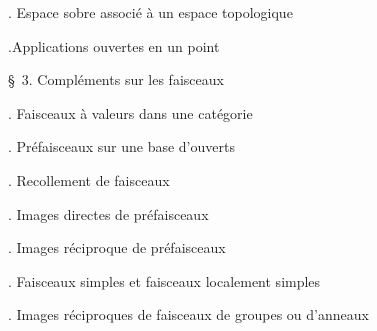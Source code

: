 \noindent{}. Espace sobre associé à un espace topologique\dotfill

\noindent{}.Applications ouvertes en un point \dotfill

\noindent\quad \S\ 3. Compléments sur les faisceaux\dotfill

\noindent{}. Faisceaux à valeurs dans une catégorie\dotfill

\noindent{}. Préfaisceaux sur une base d'ouverts\dotfill

\noindent{}. Recollement de faisceaux\dotfill

\noindent{}. Images directes de préfaisceaux\dotfill

\noindent{}. Images réciproque de préfaisceaux\dotfill

\noindent{}. Faisceaux simples et faisceaux localement simples\dotfill

\noindent{}. Images réciproques de faisceaux de groupes ou d'anneaux\dotfill


